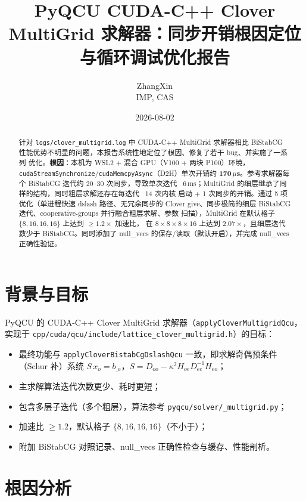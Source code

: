 \documentclass[11pt,a4paper]{article}
\title{\textbf{PyQCU CUDA-C++ Clover MultiGrid 求解器：同步开销根因定位与循环调试优化报告}}
\author{ZhangXin \\ IMP, CAS}
\date{2026-08-02}
\begin{document}
\maketitle

\begin{abstract}
针对 \texttt{logs/clover\_multigrid.log} 中 CUDA-C++ MultiGrid 求解器相比 BiStabCG
性能优势不明显的问题，本报告系统性地定位了根因、修复了若干 bug、并实施了一系列
优化。\textbf{根因}：本机为 WSL2 + 混合 GPU（V100 + 两块 P100）环境，
\texttt{cudaStreamSynchronize}/\texttt{cudaMemcpyAsync}（D2H）单次开销约
\textbf{170\,$\mu$s}。参考求解器每个 BiStabCG 迭代约 20--30 次同步，导致单次迭代
~6\,ms；MultiGrid 的细层继承了同样的结构，同时粗层求解还存在每迭代 ~14 次内核
启动 + 1 次同步的开销。通过 5 项优化（单进程快速 dslash 路径、无冗余同步的 Clover
give、同步极简的细层 BiStabCG 迭代、cooperative-groups 并行融合粗层求解、参数
扫描），MultiGrid 在默认格子 $\{8,16,16,16\}$ 上达到 \textbf{$\ge 1.2\times$} 加速比，
在 $8\times8\times8\times16$ 上达到 \textbf{$2.07\times$}，且细层迭代数少于
BiStabCG。同时添加了 null\_vecs 的保存/读取（默认开启），并完成 null\_vecs 正确性验证。
\end{abstract}

\tableofcontents

\section{背景与目标}
\label{sec:bg}

PyQCU 的 CUDA-C++ Clover MultiGrid 求解器（\texttt{applyCloverMultigridQcu}，
实现于 \texttt{cpp/cuda/qcu/include/lattice\_clover\_multigrid.h}）的目标：
\begin{itemize}
  \item 最终功能与 \texttt{applyCloverBistabCgDslashQcu} 一致，即求解奇偶预条件
        （Schur 补）系统 $S\,x_o=b_{\_o}$，$S=D_{oo}-\kappa^2 H_{oe}D_{ee}^{-1}H_{eo}$；
  \item 主求解算法迭代次数更少、耗时更短；
  \item 包含多层子迭代（多个粗层），算法参考 \texttt{pyqcu/solver/\_multigrid.py}；
  \item 加速比 $\ge 1.2$，默认格子 $\{8,16,16,16\}$（不小于）；
  \item 附加 BiStabCG 对照记录、null\_vecs 正确性检查与缓存、性能剖析。
\end{itemize}

\section{根因分析}
\label{sec:rootcause}
\end{document}
